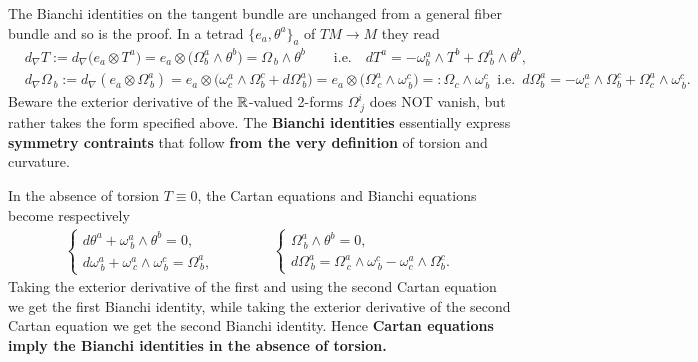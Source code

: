 \documentclass[../geometry_main.tex]{subfiles}
\begin{document}
\begin{mytheorem}
%
The Bianchi identities on the tangent bundle are unchanged from a general fiber bundle and so is the proof.
In a tetrad $\{e_a,\theta^a\}_a$ of $TM\to M$ they read
{\small
\begin{align}
    &d_\nabla T :=d_\nabla\big(e_a\otimes T^a\big)= e_a\otimes \big(\Omega^a_b \wedge \theta^b\big) = \Omega_{\, b} \wedge \theta^b\qquad \text{i.e.}\quad dT^a = -\omega_b^a\wedge T^b +\Omega^a_{\, b} \wedge \theta^b,
    \\
    &d_\nabla \Omega_{\, b} :=d_\nabla (e_a \otimes \Omega^a_{\, b})\!=\! e_a \!\otimes\! \Big(\omega_c^a\wedge \Omega^c_b + d \Omega_{\, b}^a\Big) = e_a \!\otimes\! \Big(\Omega^a_{\, c} \wedge \omega^c_{\, b}\Big) =: \Omega_c \wedge \omega^c_{\, b} \,\, \,\text{i.e.}\,\,\, d\Omega^a_b = -\omega^a_c\wedge \Omega^c_b + \Omega^a_c \wedge \omega^c_{\, b}.
\end{align}}
Beware the exterior derivative of the $\mathbb{R}$-valued 2-forms $\Omega^i_{\, j}$ does NOT vanish, but rather takes the form specified above.
The \textbf{Bianchi identities} essentially express \textbf{symmetry contraints} that follow \textbf{from the very definition} of torsion and curvature.
\end{mytheorem}


\begin{mytheorem}
In the absence of torsion $T\equiv 0$, the Cartan equations and Bianchi equations become respectively
\begin{align}\label{eq:cartan_bianchi_no_torsion}
    \begin{cases}
    d \theta^a + \omega^a_{\, b} \wedge \theta^b = 0,
    \\[4pt]
    d \omega^a_{\, b} + \omega^a_{\, c} \wedge \omega^c_{\, b} = \Omega^a_{\, b},
    \end{cases}
    \qquad\qquad
    \begin{cases}
    \Omega^a_{\, b} \wedge \theta^b = 0,
    \\[4pt]
    d \Omega^a_{\, b} = \Omega^a_{\, c} \wedge \omega^c_{\, b} - \omega^a_c\wedge \Omega^c_b.
    \end{cases}
\end{align}
Taking the exterior derivative of the first and using the second Cartan equation we get the first Bianchi identity, while taking the exterior derivative of the second Cartan equation we get the second Bianchi identity.
Hence \textbf{Cartan equations imply the Bianchi identities in the absence of torsion.}
\end{mytheorem}
\end{document}
